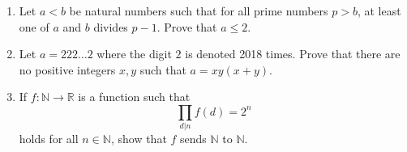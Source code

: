 \documentclass[a4paper, 12pt]{article}
\newcommand{\solution}[1]{%
   \emph{Solution}: 
    #1            
}
\renewcommand{\solution}[1]{}
\begin{document}
\begin{enumerate}
\item Let $a < b$ be natural numbers such that for all prime numbers $p > b$, at least one of $a$ and $b$ divides $p-1$. Prove that $a \leq 2$.

\solution{ Consider the arithmetic sequence $a_n = abn - 1$. By Dirichlet's theorem, this sequence contains infinitely many prime numbers (noting that clearly gcd($ab, 1) = 1$). Let $abk - 1$ be some prime number in this sequence. By the problem condition, either $a$ or $b$ divides $abk - 2$. However, as $a$ and $b$ both divide $abk$, this implies either $a$ or $b$ divides 2. Since $a < b$, this yields $a \leq 2$. \qed
}

\item Let $a = 222\dots2$ where the digit $2$ is denoted 2018 times. Prove that there are no positive integers $x, y$ such that $a = xy(x+y)$.

\solution{ Assume for contradiction such an $x, y \in \mathbb{Z}$ exists. We consider $a$ modulo 9: $a \equiv 2 \cdot 2018 = 4036 \equiv 4$ (mod 9). Thus 3 does not divide $a$, and therefore $3$ does not divide either $x$, $y$, or $x + y$. Thus, we may let $x = 3m \pm 1$ and $y = 3n \pm 1$ where the $\pm$ sign is the same for both $x$ and $y$. Note
\begin{align*}
    xy( x+y) &= ( 3m\pm 1)( 3n\pm 1)( 3m+3n\pm 2) \\
 &=( 9mn \pm 3( m+n) +1)( 3( m+n) \pm 2) \\
 &\equiv ( \pm 3( m+n) +1)( 3( m+n) \pm 2) \\
 &=\pm 9( m+n) +9( m+n) \pm 2 \\
 &\equiv \pm 2 \pmod 9
\end{align*}

As $\pm 2 \not \equiv 4$ (mod 9), this yields a contradiction. \qed

\textit{Remark:} The question can easily be generalised to any digit $d$ and length $l$ such that $dl \not \equiv \pm 2$ (mod 9)
}

\item If $f : \mathbb{N} \to \mathbb{R}$ is a function such that 
\begin{equation*}
    \prod_{d | n} f(d) = 2^n
\end{equation*}
holds for all $n \in \mathbb{N}$, show that $f$ sends $\mathbb{N}$ to $\mathbb{N}$.


\end{enumerate}
\end{document}
